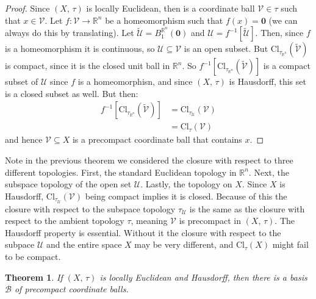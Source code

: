 \documentclass{article}
\theoremstyle{plain}
\newtheorem{theorem}{Theorem}[section]
\theoremstyle{normal}
\begin{document}
        \begin{proof}
            Since $(X,\,\tau)$ is locally Euclidean, then is a coordinate
            ball $\mathcal{V}\in\tau$ such that $x\in\mathcal{V}$. Let
            $f:\mathcal{V}\rightarrow\mathbb{R}^{n}$ be a homeomorphism such
            that $f(x)=\mathbf{0}$ (we can always do this by translating).
            Let $\tilde{\mathcal{U}}=B_{1}^{\mathbb{R}^{n}}(\mathbf{0})$ and
            $\mathcal{U}=f^{-1}[\tilde{\mathcal{U}}]$. Then, since $f$ is a
            homeomorphism it is continuous, so
            $\mathcal{U}\subseteq\mathcal{V}$ is an open subset. But
            $\textrm{Cl}_{\tau_{\mathbb{R}^{n}}}(\tilde{\mathcal{V}})$ is
            compact, since it is the closed unit ball in $\mathbb{R}^{n}$.
            So
            $f^{-1}[\textrm{Cl}_{\tau_{\mathbb{R}^{n}}}(\tilde{\mathcal{V}})]$
            is a compact subset of $\mathcal{U}$ since $f$ is a homeomorphisn,
            and since $(X,\,\tau)$ is Hausdorff, this set is a closed subset as
            well. But then:
            \begin{align}
                f^{-1}[\textrm{Cl}_{\tau_{\mathbb{R}^{n}}}(\tilde{\mathcal{V}})]
                &=\textrm{Cl}_{\tau_{\mathcal{U}}}(\mathcal{V})\\
                &=\textrm{Cl}_{\tau}(\mathcal{V})
            \end{align}
            and hence $\mathcal{V}\subseteq{X}$ is a precompact coordinate
            ball that contains $x$.
        \end{proof}
        Note in the previous theorem we considered the closure with respect to
        three different topologies. First, the standard Euclidean topology in
        $\mathbb{R}^{n}$. Next, the subspace topology of the open set
        $\mathcal{U}$. Lastly, the topology on $X$. Since $X$ is Hausdorff,
        $\textrm{Cl}_{\tau_{\mathcal{U}}}(\mathcal{V})$ being compact implies it
        is closed. Because of this the closure with respect to the subspace
        topology $\tau_{\mathcal{U}}$ is the same as the closure with respect
        to the ambient topology $\tau$, meaning $\mathcal{V}$ is precompact
        in $(X,\,\tau)$. The Hausdorff property is essential. Without it the
        closure with respect to the subpace $\mathcal{U}$ and the entire space
        $X$ may be very different, and $\textrm{Cl}_{\tau}(X)$ might fail to be
        compact.
        \begin{theorem}
            If $(X,\,\tau)$ is locally Euclidean and Hausdorff, then there is a
            basis $\mathcal{B}$ of precompact coordinate balls.
        \end{theorem}
\end{document}
